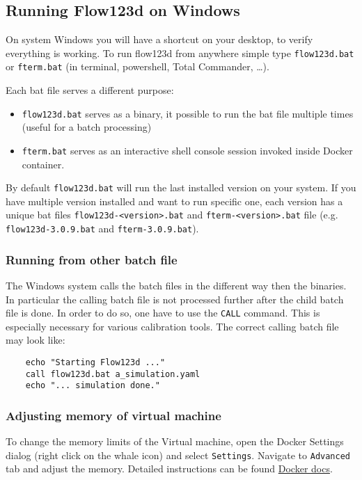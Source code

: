 \subsection{Running Flow123d on Windows}
On system Windows you will have a shortcut on your desktop, to verify everything is working. To run flow123d from anywhere simple type
\verb'flow123d.bat' or \verb'fterm.bat' (in terminal, powershell, Total Commander, \dots).

Each bat file serves a different purpose:
\begin{itemize}
  \item \verb'flow123d.bat' serves as a binary, it possible to run the bat file multiple times (useful for a batch processing)
  \item \verb'fterm.bat' serves as an interactive shell console session invoked inside Docker container.
\end{itemize}

By default \verb'flow123d.bat' will run the last installed version on your system. If you have multiple version installed and want to run specific one, each version has a unique bat files \verb'flow123d-<version>.bat' and \verb'fterm-<version>.bat' file (e.g. \verb'flow123d-3.0.9.bat' and \verb'fterm-3.0.9.bat').


\subsubsection{Running from other batch file}
The Windows system calls the batch files in the different way then the binaries. In particular the calling batch file is not processed further after the child batch
file is done. In order to do so, one have to use the \verb'CALL' command. This is especially necessary for various calibration tools. The correct calling batch file
may look like:
\begin{verbatim}
    echo "Starting Flow123d ..."
    call flow123d.bat a_simulation.yaml
    echo "... simulation done."
\end{verbatim}


\subsubsection{Adjusting memory of virtual machine}
To change the memory limits of the Virtual machine, open the Docker Settings dialog (right click on the whale icon) and select \verb'Settings'.
Navigate to \verb'Advanced' tab and adjust the memory. Detailed instructions can be found \href{https://docs.docker.com/docker-for-windows/#advanced}{Docker docs}.



